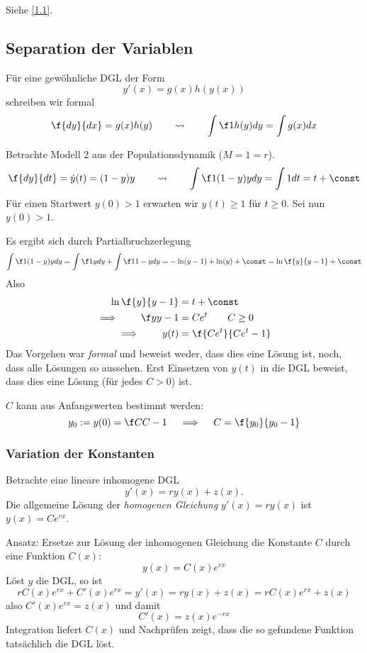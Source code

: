 \documentclass[
]{mycourse}
\begin{document}
Siehe \ref{1.1}.

\subsection{Separation der Variablen}


Für eine gewöhnliche DGL der Form
\[
	y'(x) = g(x) h(y(x))
\]
schreiben wir formal
\[
	\f {dy}{dx} = g(x) h(y)
	\qquad \leadsto \qquad
	\int \f 1{h(y)} dy = \int g(x) dx
\]

\begin{ex} \label{1.3}
	Betrachte Modell 2 aus der Populationsdynamik ($M=1=r$).
	\begin{align*}
		\f {dy}{dt} = \dot y(t) = (1-y)y
		\qquad \leadsto \qquad
		\int \f 1{(1-y)y} dy = \int 1 dt = t + \const
	\end{align*}
	Für einen Startwert $y(0) > 1$ erwarten wir $y(t) \ge 1$ für $t \ge 0$.
	Sei nun $y(0) > 1$.

	Es ergibt sich durch Partialbruchzerlegung
	\begin{align*}
		\int \f 1{(1-y)y} dy 
		= \int \f 1y dy + \int \f1{1-y} dy
		= - \ln (y-1) + \ln(y) + \const
		= \ln \f {y}{y-1} + \const
	\end{align*}
	Also 
	\begin{align*}
		\ln \f {y}{y-1} &= t + \const \\
		\implies \qquad	\f y{y-1} &= C e^t \qquad C \ge 0 \\
		\implies \qquad y(t) &= \f {Ce^t}{Ce^t - 1}
	\end{align*}
	Das Vorgehen war \emph{formal} und beweist weder, dass dies eine Lösung ist, noch, dass alle Lösungen so aussehen.
	Erst Einsetzen von $y(t)$ in die DGL beweist, dass dies eine Lösung (für jedes $C>0$) ist.

	$C$ kann aus Anfangswerten bestimmt werden:
	\[
		y_0 := y(0) = \f C{C-1}
		\quad \implies \quad
		C = \f {y_0}{y_0-1}
	\]
\end{ex}

\subsubsection{Variation der Konstanten}

Betrachte eine lineare inhomogene DGL
\[
	y'(x) = ry(x) + z(x).
\]
Die allgemeine Lösung der \emph{homogenen Gleichung} $y'(x) = ry(x)$ ist $y(x) = Ce^{rx}$.

Ansatz: Ersetze zur Lösung der inhomogenen Gleichung die Konstante $C$ durch eine Funktion $C(x)$:
\[
	y(x) = C(x) e^{rx}
\]
Löst $y$ die DGL, so ist
\[
	rC(x)e^{rx} + C'(x)e^{rx} = y'(x) = ry(x) + z(x) = rC(x)e^{rx} + z(x)
\]
also $C'(x) e^{rx} = z(x)$ und damit
\[
	C'(x) = z(x) e^{-rx}
\]
Integration liefert $C(x)$ und Nachprüfen zeigt, dass die so gefundene Funktion tatsächlich die DGL löst.
\end{document}
